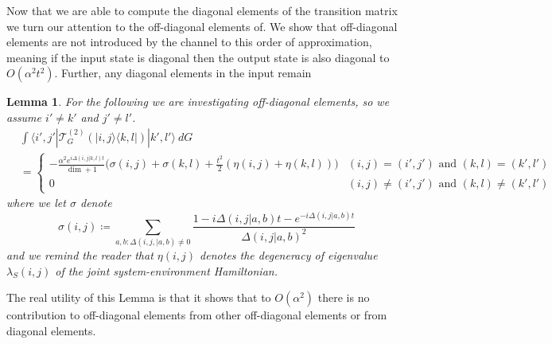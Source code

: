 \documentclass{article}
\newtheorem{lemma}[theorem]{Lemma}
\newcommand{\ket}[1]{|#1\rangle}
\newcommand{\bra}[1]{\langle #1|}
\newcommand{\ketbra}[2]{| #1\rangle\! \langle #2|}
\newcommand{\bigo}[1]{O\left( #1 \right)}
\begin{document}
Now that we are able to compute the diagonal elements of the transition matrix we turn our attention to the off-diagonal elements of. We show that off-diagonal elements are not introduced by the channel to this order of approximation, meaning if the input state is diagonal then the output state is also diagonal to $\bigo{\alpha^2 t^2}$. Further, any diagonal elements in the input remain 
\begin{lemma}
     For the following we are investigating off-diagonal elements, so we assume $i' \neq k'$ and $j' \neq l'$.
    \begin{align}
    &\int \bra{i', j'}  \mathcal{T}^{(2)}_G \left( \ketbra{i, j}{k, l} \right) \ket{k', l'} ~dG \\
    &=\begin{cases}
        -\frac{\alpha^2 e^{i \Delta(i,j|k,l) t}}{\dim + 1} \bigg( \sigma(i,j) + \sigma(k,l) + \frac{t^2}{2}(\eta(i,j) + \eta(k,l)) \bigg) & (i, j) = (i', j') \text{ and } (k, l) = (k', l') \\
        0 & (i, j) \neq (i', j') \text{ and } (k, l) \neq (k', l')
    \end{cases}
    \end{align}
    where we let $\sigma$ denote
    \begin{equation}
        \sigma(i,j) \coloneqq \sum_{a,b: \Delta(i,j,|a,b) \neq 0} \frac{1 - i \Delta(i,j|a,b)t - e^{-i \Delta(i,j|a,b) t}}{\Delta(i,j|a,b)^2}
    \end{equation}
    and we remind the reader that $\eta(i,j)$ denotes the degeneracy of eigenvalue $\lambda_S(i,j)$ of the joint system-environment Hamiltonian. 
\end{lemma}
The real utility of this Lemma is that it shows that to $O(\alpha^2)$ there is no contribution to off-diagonal elements from other off-diagonal elements or from diagonal elements.
\end{document}
